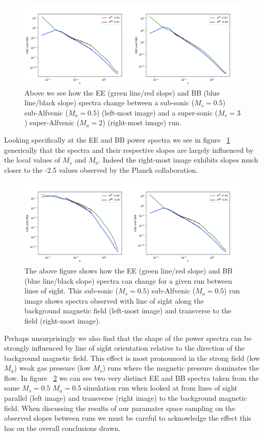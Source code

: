 \begin{figure}[h]
\includegraphics[width=\linewidth]{half_half_to_3_2_spectra_y.png}
\caption{Above we see how the EE (green line/red slope) and BB (blue line/black
slope) spectra change between a sub-sonic
($M_s=0.5$) sub-Alfvenic ($M_a=0.5$) (left-most image) and a super-sonic
($M_s=3$) super-Alfvenic ($M_a=2$) (right-most image) run.}
\label{fig:half_half_3_2_spectra}
\end{figure}

Looking specifically at the EE and BB power spectra we see in figure
~\ref{fig:half_half_3_2_spectra} generically that the spectra and their
respective slopes are largely influenced by the local values of $M_s$ and
$M_a$. Indeed the right-most image exhibits slopes much closer to the -2.5
values observed by the Planck collaboration. 

\begin{figure}[h]
\includegraphics[width=\linewidth]{half_half_spectra_x_y.png}
\caption{The above figure shows how the EE (green line/red slope) and BB (blue line/black
slope) spectra can change for a given run between lines of sight. This sub-sonic
($M_s=0.5$) sub-Alfvenic ($M_a=0.5$) run image shows spectra observed with line of sight along the
background magnetic field (left-most image) and transverse to the field
(right-most image).}
\label{fig:half_half_los_spectra}
\end{figure}

Perhaps unsurprisingly we also find that the shape of the power spectra can be
strongly influenced by line of sight orientation relative to the direction of
the background magnetic field. This effect is most pronounced in the strong
field (low $M_a$) weak gas pressure (low $M_s$) runs where the magnetic pressure
dominates the flow. In figure ~\ref{fig:half_half_los_spectra} we can see two
very distinct EE and BB spectra taken from the same $M_s=0.5$ $M_a=0.5$
simulation run when looked at from lines of sight parallel (left image) and
transverse (right image) to the background magnetic field. When discussing the
results of our paramater space sampling on the observed slopes between runs we
must be careful to acknowledge the effect this has on the overall conclusions
drawn.

